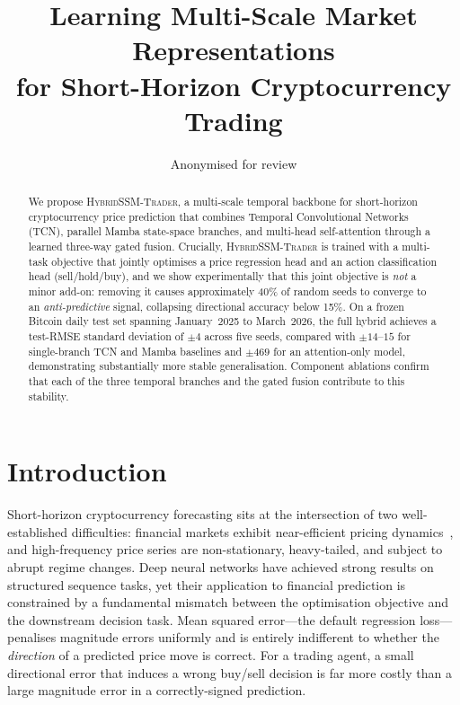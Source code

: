 \documentclass[runningheads]{llncs}
\begin{document}
\title{Learning Multi-Scale Market Representations\\
       for Short-Horizon Cryptocurrency Trading}

\author{Anonymised for review}
\maketitle

\begin{abstract}
We propose \textsc{HybridSSM-Trader}, a multi-scale temporal backbone for short-horizon
cryptocurrency price prediction that combines Temporal Convolutional Networks
(TCN), parallel Mamba state-space branches, and multi-head self-attention through
a learned three-way gated fusion.  Crucially, \textsc{HybridSSM-Trader} is trained with
a multi-task objective that jointly optimises a price regression head and an
action classification head (sell/hold/buy), and we show experimentally that this
joint objective is \emph{not} a minor add-on: removing it causes approximately
40\% of random seeds to converge to an \emph{anti-predictive} signal, collapsing
directional accuracy below 15\%.  On a frozen Bitcoin daily test set spanning
January~2025 to March~2026, the full hybrid achieves a test-RMSE standard
deviation of $\pm 4$ across five seeds, compared with $\pm 14$--$15$ for
single-branch TCN and Mamba baselines and $\pm 469$ for an attention-only model,
demonstrating substantially more stable generalisation.  Component ablations
confirm that each of the three temporal branches and the gated fusion
contribute to this stability.
\end{abstract}

\section{Introduction}
\label{sec:intro}

Short-horizon cryptocurrency forecasting sits at the intersection of two
well-established difficulties: financial markets exhibit near-efficient pricing
dynamics~\cite{fama1970efficient}, and high-frequency price series are
non-stationary, heavy-tailed, and subject to abrupt regime changes.  Deep neural
networks have achieved strong results on structured sequence tasks, yet their
application to financial prediction is constrained by a fundamental mismatch
between the optimisation objective and the downstream decision task.  Mean
squared error---the default regression loss---penalises magnitude errors uniformly
and is entirely indifferent to whether the \emph{direction} of a predicted price
move is correct.  For a trading agent, a small directional error that induces a
wrong buy/sell decision is far more costly than a large magnitude error in a
correctly-signed prediction.
\end{document}
